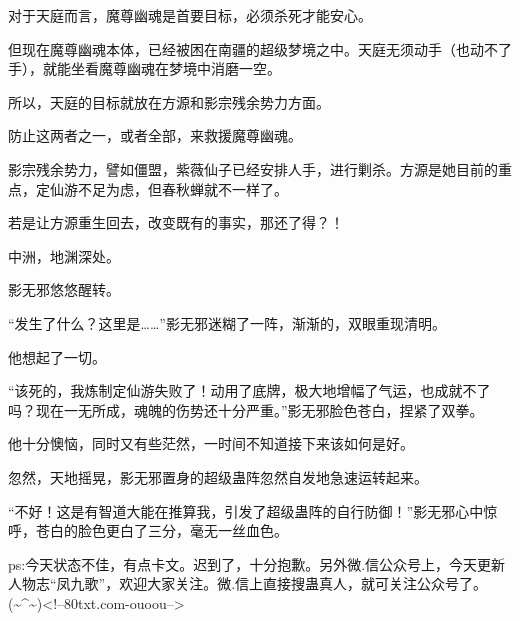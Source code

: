 \begin{this_body}
对于天庭而言，魔尊幽魂是首要目标，必须杀死才能安心。

但现在魔尊幽魂本体，已经被困在南疆的超级梦境之中。天庭无须动手（也动不了手），就能坐看魔尊幽魂在梦境中消磨一空。

所以，天庭的目标就放在方源和影宗残余势力方面。

防止这两者之一，或者全部，来救援魔尊幽魂。

影宗残余势力，譬如僵盟，紫薇仙子已经安排人手，进行剿杀。方源是她目前的重点，定仙游不足为虑，但春秋蝉就不一样了。

若是让方源重生回去，改变既有的事实，那还了得？！

中洲，地渊深处。

影无邪悠悠醒转。

“发生了什么？这里是……”影无邪迷糊了一阵，渐渐的，双眼重现清明。

他想起了一切。

“该死的，我炼制定仙游失败了！动用了底牌，极大地增幅了气运，也成就不了吗？现在一无所成，魂魄的伤势还十分严重。”影无邪脸色苍白，捏紧了双拳。

他十分懊恼，同时又有些茫然，一时间不知道接下来该如何是好。

忽然，天地摇晃，影无邪置身的超级蛊阵忽然自发地急速运转起来。

“不好！这是有智道大能在推算我，引发了超级蛊阵的自行防御！”影无邪心中惊呼，苍白的脸色更白了三分，毫无一丝血色。

ps:今天状态不佳，有点卡文。迟到了，十分抱歉。另外微.信公众号上，今天更新人物志“凤九歌”，欢迎大家关注。微.信上直接搜蛊真人，就可关注公众号了。(\~{}\^{}\~{})<!--80txt.com-ouoou-->

\end{this_body}

